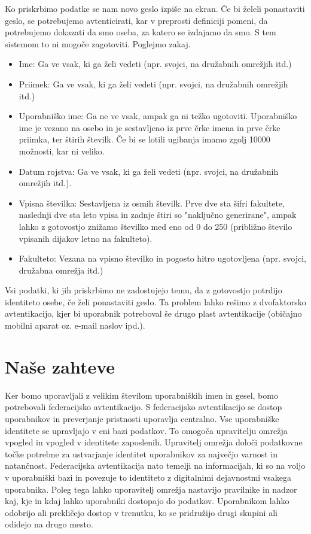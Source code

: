 \documentclass[a4paper,12pt,openright]{book}
\begin{document}
Ko priskrbimo podatke se nam novo geslo izpiše na ekran. Če bi želeli ponastaviti geslo, se potrebujemo avtenticirati, kar v preprosti definiciji pomeni, da potrebujemo dokazati da smo oseba, za katero se izdajamo da smo. S tem sistemom to ni mogoče zagotoviti. Poglejmo zakaj.

\begin{itemize}
    \item Ime: Ga ve vsak, ki ga želi vedeti (npr. svojci, na družabnih omrežjih itd.)
    \item Priimek: Ga ve vsak, ki ga želi vedeti (npr. svojci, na družabnih omrežjih itd.)
    \item Uporabniško ime: Ga ne ve vsak, ampak ga ni težko ugotoviti. Uporabniško ime je vezano na osebo in je sestavljeno iz prve črke imena in prve črke priimka, ter štirih številk. Če bi se lotili ugibanja imamo zgolj 10000 možnosti, kar ni veliko.
    \item Datum rojstva: Ga ve vsak, ki ga želi vedeti (npr. svojci, na družabnih omrežjih itd.).
    \item Vpisna številka: Sestavljena iz osmih številk. Prve dve sta šifri fakultete, naslednji dve sta leto vpisa in zadnje štiri so "naključno generirane", ampak lahko z gotovostjo znižamo številko med eno od 0 do 250 (približno število vpisanih dijakov letno na fakulteto).
    \item Fakulteto: Vezana na vpisno številko in pogosto hitro ugotovljena (npr. svojci, družabna omrežja itd.)
\end{itemize}

Vsi podatki, ki jih priskrbimo ne zadostujejo temu, da z gotovostjo potrdijo identiteto osebe, če želi ponastaviti geslo. Ta problem lahko rešimo z dvofaktorsko avtentikacijo, kjer bi uporabnik potreboval še drugo plast avtentikacije (običajno mobilni aparat oz. e-mail naslov ipd.). 

\section{Naše zahteve}

Ker bomo uporavljali z velikim številom uporabniških imen in gesel, bomo potrebovali federacijsko avtentikacijo. S federacijsko avtentikacijo se dostop uporabnikov in preverjanje pristnosti uporavlja centralno. Vse uporabniške identitete se upravljajo v eni bazi podatkov. To omogoča upravitelju omrežja vpogled in vpogled v identitete zaposlenih. Upravitelj omrežja določi podatkovne točke potrebne za ustvarjanje identitet uporabnikov za največjo varnost in natančnost. Federacijska avtentikacija nato temelji na informacijah, ki so na voljo v uporabniški bazi in povezuje to identiteto z digitalnimi dejavnostmi vsakega uporabnika. Poleg tega lahko uporavitelj omrežja nastavijo pravilnike in nadzor kaj, kje in kdaj lahko uporabniki dostopajo do podatkov. Uporabnikom lahko odobrijo ali prekličejo dostop v trenutku, ko se pridružijo drugi skupini ali odidejo na drugo mesto.
\newline
\end{document}
